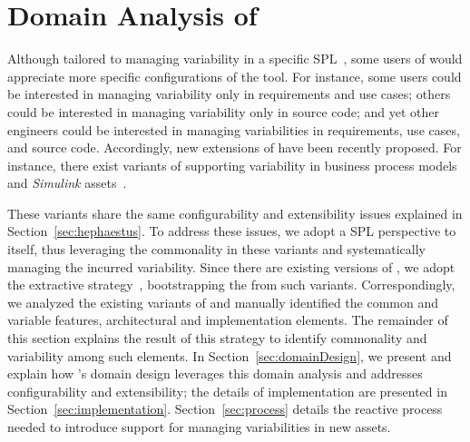
\section{Domain Analysis of \hpl}
\label{sec:domainAnalysis}

Although tailored to managing variability in a specific SPL~\cite{ferreira:2010}, some users of \hp{} would appreciate more specific configurations of the tool. For instance, some users could be interested in managing variability only in requirements and use cases; others could be interested in managing variability only in source code; and yet other engineers could be interested in managing variabilities in requirements, use cases, and source code.  Accordingly, new extensions of \hp{} have been recently proposed. For instance, there exist variants of \hp{} supporting variability in business process models~\cite{Machado:2011:MVB:1960502.1960508} and \emph{Simulink} assets~\cite{simulink}.

These variants share the same configurability and extensibility issues explained in Section~\ref{sec:hephaestus}. To address these issues, we adopt a SPL perspective to \hp{} itself, thus leveraging the commonality in these variants and systematically managing the incurred variability. Since there are existing versions of \hp, we adopt the extractive strategy~\cite{kruegerPFE01}, bootstrapping the \hpl{} from such variants. Correspondingly, we analyzed the existing variants of \hp{} and manually identified the common and variable features, architectural and implementation elements. The remainder of this section explains the result of this strategy to identify commonality and variability among such elements. In Section~\ref{sec:domainDesign}, we present and explain how \hpl's domain design leverages this domain analysis and addresses configurability and extensibility; the details of implementation are presented in Section~\ref{sec:implementation}. Section~\ref{sec:process} details the reactive process needed to introduce support for managing variabilities in new assets.


